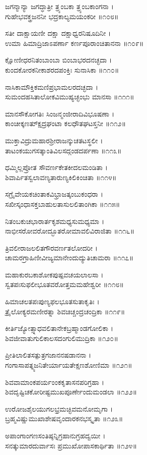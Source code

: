 ಜಗನ್ಮಾನ್ಯಾ ಜಗದ್ಧಾತ್ರೀ ತ್ರ್ಯಂಬಕಾ ತ್ರ್ಯಂಬಕಾಂಗನಾ ।\\
ಗುಹೇಭವಕ್ತ್ರಜನನೀ ಭದ್ರಕಾಲ್ಯಮಯಂಕರೀ ॥೧೦೮॥

ಸತೀ ದಾಕ್ಷಾಯಣೀ ದಕ್ಷಾ ದಕ್ಷಾಧ್ವರನಿಷೂದಿನೀ ।\\
ಉಮಾ ಹಿಮಾದ್ರಿಜಾಽಪರ್ಣಾ ಕರ್ಣಪೂರಾಂಚಿತಾನನಾ ॥೧೦೯॥

ಕ್ಷೋಣೀಧರನಿತಂಬಾಂಬಾ ಬಿಂಬಾಭರದನಚ್ಛದಾ ।\\
ಕುಂದಕೋರಕನೀಕಾಶರದಪಂಕ್ತಿಃ ಸುನಾಸಿಕಾ ॥೧೧೦॥

ನಾಸಿಕಾಮೌಕ್ತಿಕಮಣಿಪ್ರಭಾಮಲರದಚ್ಛದಾ ।\\
ಸುಮಂದಹಸಿತಾಲೋಕವಿಮುಹ್ಯಚ್ಛಂಭು ಮಾನಸಾ ॥೧೧೧॥

ಮಾನಸೌಕೋಗತಿಃ ಸಿಂಜನ್ಮಂಜೀರಾದಿವಿಭೂಷಣಾ ।\\
ಕಾಂಚೀಕ್ಕಣತ್ಕ್ಷುದ್ರಘಂಟಾ ಕಲಧೌತಘಟಸ್ತನೀ ॥೧೧೨॥

ಮುಕ್ತಾವಿದ್ರುಮಹಾರಶ್ರೀರಾಜನ್ಕುಚತಟಸ್ಥಲೀ ।\\
ತಾಟಂಕಯುಗಸತ್ಕಾಂತಿವಿಲಸದ್ಗಂಡದರ್ಪಣಾ ॥೧೧೩॥

ಧಮ್ಮಿಲ್ಲಪ್ರೋತ ಸೌವರ್ಣಕೇತಕೀದಲಮಂಡಿತಾ ।\\
ಶಿವಾರ್ಪಿತಸ್ವಲಾವಣ್ಯತಾರುಣ್ಯಕಿಲಿಕಿಂಚಿತಾ ॥೧೧೪॥

ಸಗ್ರೈವೇಯಕಚಿಂತಾಕವಿಭ್ರಾಜತ್ಕಂಬುಕಂಧರಾ ।\\
ಸಖೀಸ್ಕಂಧಾಸಕ್ತಬಾಹುಲತಾಸುಲಲಿತಾಂಗಿಕಾ ॥೧೧೫॥

ನಿತಂಬಕುಚಭಾರಾರ್ತಕೃಶಮಧ್ಯಸುಮಧ್ಯಮಾ ।\\
ನಾಭೀಸರೋವರೋದ್ಭೂತರೋಮಾವಲಿವಿರಾಜಿತಾ ॥೧೧೬॥

ತ್ರಿವಲೀರಾಜಲಲಿತಗೌರವರ್ಣತಲೋದರೀ ।\\
ಚಾಮರಗ್ರಾಹಿಣೀವೀಜ್ಯಮಾನೇಂದುದ್ಯುತಿಚಾಮರಾ ॥೧೧೭॥

ಮಹಾಕುರಬಕಾಶೋಕಪುಷ್ಪವಚಯಲಾಲಸಾ ।\\
ಸ್ವತಪಃಸುಫಲೀಭೂತವರೋತ್ತಮಮಹೇಶ್ವರೀ ॥೧೧೮॥

ಹಿಮಾಚಲತಪಃಪುಣ್ಯಫಲಭೂತಸುತಾಕೃತಿಃ ।\\
ತ್ರೈಲೋಕ್ಯರಮಣೀರತ್ನಾ ಶಿವಚಿಚ್ಚಂದ್ರಚಂದ್ರಿಕಾ ॥೧೧೯॥

ಕೀರ್ತಿಜ್ಯೋತ್ಸ್ನಾಧವಲಿತಾನೇಕಬ್ರಹ್ಮಾಂಡಗೋಲಿಕಾ ।\\
ಶಿವಜೀವಾತುಗುಲಿಕಾಲಸದಂಗುಲಿಮುದ್ರಿಕಾ ॥೧೨೦॥

ಪ್ರೀತಿಲಾಲಿತಸತ್ಪುತ್ರಗಜಾನನಷಡಾನನಾ ।\\
ಗಂಗಾಸಾಪತ್ನ್ಯಜನಿತೇರ್ಯಾಯತೇಕ್ಷಣಶೋಣಿಮಾ ॥೧೨೧॥

ಶಿವವಾಮಾಂಕಪರ್ಯಂಂಕಕೃತಾಸನಪರಿಗ್ರಹಾ ।\\
ಶಿವದೃಷ್ಟಿಚಕೋರೀಷ್ಟಮುಖಪೂರ್ಣೇಂದುಮಂಡಲಾ ॥೧೨೨॥

ಉರೋಜಶೈಲಯುಗಲಭ್ರಮಚ್ಛಿವಮನೋಮೃಗಾ ।\\
ಬ್ರಹ್ಮವಿಷ್ಣುಮುಖಾಶೇಷವೃಂದಾರಕನಭಸ್ಕೃತಾ ॥೧೨೩॥

ಅಪಾಂಗಾಂಗಣಸಂತಿಷ್ಠನ್ನಿಗ್ರಹಾನುಗ್ರಹದ್ವಯೀ ।\\
ಸನತ್ಕುಮಾರದುರ್ವಾಸಃ ಪ್ರಮುಖೋಪಾಸಕಾರ್ಥಿತಾ ॥೧೨೪॥


